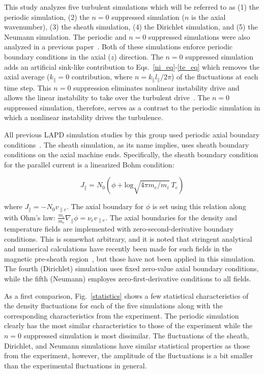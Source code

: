 \documentclass[showpacs,preprintnumbers,amsmath,amssymb,superscriptaddress,aip]{revtex4-1}
\def\beq{\begin{equation}}
\def\eeq{\end{equation}}
\def\para{\parallel}
\def\grad{\nabla}
\newcommand{\gradpar}{\grad_\parallel}
\newcommand{\vpe}{v_{\parallel e}}
\newcommand{\nue}{\nu_{e}}
\newcommand{\fmie}{\frac{m_i}{m_e}}
\begin{document}
This study analyzes five turbulent simulations which will be referred to as (1) the periodic simulation, (2) the $n=0$ suppressed simulation ($n$ is the axial wavenumber), 
(3) the sheath simulation, (4) the Dirichlet simulation,
and (5) the Neumann simulation.
The periodic and $n=0$ suppressed simulations were also analyzed in a previous paper~\cite{friedman2012b}. Both of these simulations enforce periodic boundary conditions in the axial ($z$)
direction. The $n=0$ suppressed simulation adds an artificial sink-like contribution to Eqs.~\ref{ni_eq}-\ref{te_eq} which removes the axial average 
($k_\parallel = 0$ contribution, where $n = k_\para l_\para /2 \pi$) of the fluctuations at each time step. This $n=0$ suppression eliminates nonlinear instability drive and allows
the linear instability to take over the turbulent drive~\cite{friedman2012b}. The $n=0$ suppressed simulation, therefore, serves as a contrast to the periodic simulation in which a nonlinear instability
drives the turbulence.
  
All previous LAPD simulation studies by this group used periodic axial boundary conditions~\cite{Popovich2010a,Popovich2010b,Umansky2011,friedman2012,friedman2012b}.
The sheath simulation, as its name implies, uses sheath boundary conditions on the axial machine ends. Specifically, the sheath boundary
condition for the parallel current is a linearized Bohm condition:

\beq
\label{sheath_bndry}
J_\para = N_0 (\phi + \text{log} \sqrt{4 \pi m_e/m_i} \ T_e) 
\eeq

where $J_\para = - N_0 \vpe$. The axial boundary for $\phi$ is set using this relation along with Ohm's law: $ \fmie \gradpar \phi = \nue \vpe$. 
The axial boundaries for the density and temperature fields are implemented with zero-second-derivative boundary conditions. This is somewhat arbitrary, and it is noted
that stringent analytical and numerical calculations have recently been made for such fields in the magnetic pre-sheath region~\cite{loizu2012}, but those have not been applied in this simulation.
The fourth (Dirichlet) simulation uses fixed zero-value axial boundary conditions, while the fifth (Neumann) employes zero-first-derivative conditions to all fields.

As a first comparison, Fig.~\ref{statistics} shows a few statistical characteristics of the density fluctuations for each of the five simulations along with the corresponding
characteristics from the experiment. The periodic simulation clearly has the most similar characteristics to those of the experiment while the $n=0$ suppressed simulation is most dissimilar.
The fluctuations of the sheath, Dirichlet, and Neumann simulations have similar statistical properties as those from the experiment, however, 
the amplitude of the fluctuations is a bit smaller than the experimental fluctuations in general.
\end{document}
